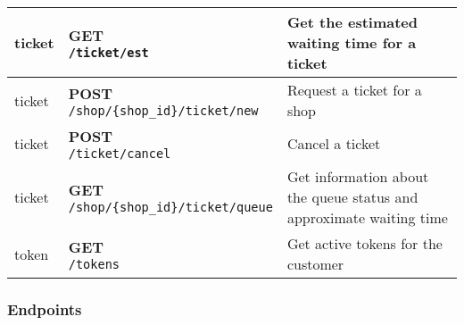 \begin{tabularx}{\textwidth}{|p{}|l|X|}
ticket & \makecell{\textbf{GET} \\ \texttt{/ticket/est}}  & Get the estimated waiting time for a ticket \\\hline
ticket & \makecell{\textbf{POST} \\ \texttt{/shop/\{shop\_id\}/ticket/new}}  & Request a ticket for a shop \\\hline
ticket & \makecell{\textbf{POST} \\ \texttt{/ticket/cancel}}  & Cancel a ticket \\\hline
ticket & \makecell{\textbf{GET} \\ \texttt{/shop/\{shop\_id\}/ticket/queue}}  & Get information about the queue status and approximate waiting time \\\hline
token & \makecell{\textbf{GET} \\ \texttt{/tokens}}  & Get active tokens for the customer \\\hline
\end{tabularx}

\subsubsection{Endpoints}

